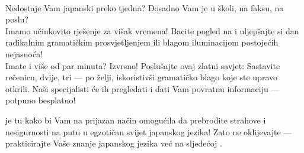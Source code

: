 \documentclass[intermediate]{grampig}
\begin{document}
	\begin{minipage}{\width}
		\onehalfspacing
		{\Large {}} \\[-0.5em]
		
		Nedostaje Vam japanski preko tjedna?
		Dosadno Vam je u školi, na faksu, na poslu? \\[-0.5em]
				
		Imamo učinkovito rješenje za višak vremena! 
		Bacite pogled na  i uljepšajte si dan radikalnim gramatičkim prosvjetljenjem ili blagom iluminacijom postojećih nejasnoća! \\[-0.5em]
		
		Imate i više od par minuta? Izvrsno!
		Poslušajte ovaj zlatni savjet: 
		Sastavite rečenicu, dvije, tri --- po želji, iskoristivši gramatičko blago koje ste upravo otkrili. 
		Naši specijalisti će ih pregledati i dati Vam povratnu informaciju --- potpuno besplatno!
		
		\begin{center}
		\end{center}
		
		 je tu kako bi Vam na prijazan način omogućila da prebrodite strahove i nesigurnosti na putu u egzotičan svijet japanskog jezika! 
		Zato ne oklijevajte --- prakticirajte Vaše znanje japanskog jezika već na sljedećoj .
	\end{minipage}
\end{document}
